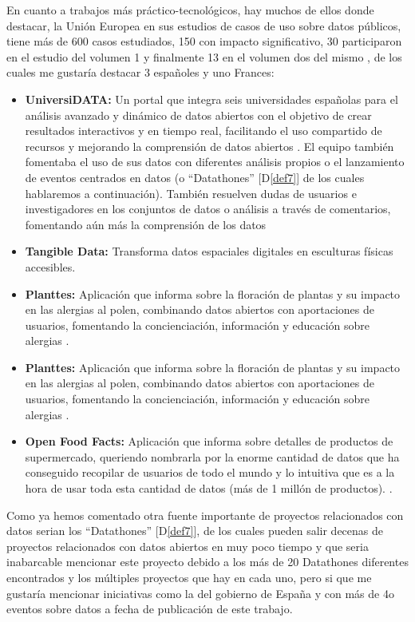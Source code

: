 	En cuanto a trabajos más práctico-tecnológicos, hay muchos de ellos donde destacar, la Unión Europea en sus estudios de casos de uso sobre datos públicos, tiene más de 600 casos estudiados, 150 con impacto significativo, 30 participaron en el estudio del volumen 1 \citep{UseCaseObservatory2022V1} y finalmente 13 en el volumen dos del mismo \citep{UseCaseObservatory2024V2}, de los cuales me gustaría destacar 3 españoles y uno Frances:
	\begin{itemize}
		\item \textbf{UniversiDATA:} Un portal que integra seis universidades españolas para el análisis avanzado y dinámico de datos abiertos con el objetivo de crear resultados interactivos y en tiempo real, facilitando el uso compartido de recursos y mejorando la comprensión de datos abiertos \citep{UniversiDATA}. El equipo también fomentaba el uso de sus datos con diferentes análisis propios \citep{UniversiDATAAnalisis} o el lanzamiento de eventos centrados en datos (o ``Datathones'' [D\ref{def7}] \citep{UniversiDATADatathon} de los cuales hablaremos a continuación). También resuelven dudas de usuarios e investigadores en los conjuntos de datos o análisis a través de comentarios, fomentando aún más la comprensión de los datos 
		\item \textbf{Tangible Data:} Transforma datos espaciales digitales en esculturas físicas accesibles.
		\item \textbf{Planttes:} Aplicación que informa sobre la floración de plantas y su impacto en las alergias al polen, combinando datos abiertos con aportaciones de usuarios, fomentando la concienciación, información y educación sobre alergias \citep{PlanttesDataAPP}.
		\item \textbf{Planttes:} Aplicación que informa sobre la floración de plantas y su impacto en las alergias al polen, combinando datos abiertos con aportaciones de usuarios, fomentando la concienciación, información y educación sobre alergias \citep{PlanttesDataAPP}.
		\item \textbf{Open Food Facts:} Aplicación que informa sobre detalles de productos de supermercado, queriendo nombrarla por la enorme cantidad de datos que ha conseguido recopilar de usuarios de todo el mundo y lo intuitiva que es a la hora de usar toda esta cantidad de datos (más de 1 millón de productos). \citep{OpenFoodFactsDataAPP}.
	\end{itemize}
	
	Como ya hemos comentado otra fuente importante de proyectos relacionados con datos serian los ``Datathones'' [D\ref{def7}], de los cuales pueden salir decenas de proyectos relacionados con datos abiertos en muy poco tiempo y que seria inabarcable mencionar este proyecto debido a los más de 20 Datathones diferentes encontrados y los múltiples proyectos que hay en cada uno, pero si que me gustaría mencionar iniciativas como la del gobierno de España \citep{EventosDatosAbiertosGOB} y \citep{EventosDatathonGOB} con más de 4o eventos sobre datos a fecha de publicación de este trabajo.
	
